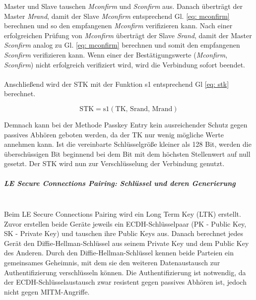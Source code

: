 Master und Slave tauschen \textit{Mconfirm} und \textit{Sconfirm} aus. Danach überträgt der Master \textit{Mrand}, damit der Slave \textit{Mconfirm} entsprechend Gl. \ref{eq: mconfirm} berechnen und so den empfangenen \textit{Mconfirm} verifizieren kann. Nach einer erfolgreichen Prüfung von \textit{Mconfirm} überträgt der Slave \textit{Srand}, damit der Master \textit{Sconfirm} analog zu Gl. \ref{eq: mconfirm} berechnen und somit den empfangenen \textit{Sconfirm} verifizieren kann. Wenn einer der Bestätigungswerte (\textit{Mconfirm}, \textit{Sconfirm}) nicht erfolgreich verifiziert wird, wird die Verbindung sofort beendet.
\\\\
Anschließend wird der STK mit der Funktion s1 \cite{BtSpec4.2_2290} 
entsprechend Gl \ref{eq: stk} \cite{BtSpec4.2_2305-2306} berechnet.

\begin{equation}
    \text{STK} = \text{s1}(\text{TK, Srand, Mrand})
    \label{eq: stk}
\end{equation}

Demnach kann bei der Methode Passkey Entry kein ausreichender Schutz gegen passives Abhören geboten werden, da der TK nur wenig mögliche Werte annehmen kann. Ist die vereinbarte Schlüsselgröße kleiner als 128 Bit, werden die überschüssigen Bit beginnend bei dem Bit mit dem höchsten Stellenwert auf null gesetzt. Der STK wird nun zur Verschlüsselung der Verbindung genutzt. \cite{BtSpec4.2_2305-2306}

\subparagraph{LE Secure Connections Pairing: Schlüssel und deren Generierung} \mbox{} \vspace{0.2cm} \\
Beim LE Secure Connections Pairing wird ein Long Term Key (LTK) erstellt. Zuvor erstellen beide Geräte jeweils ein ECDH-Schlüsselpaar (PK - Public Key, SK - Private Key) und tauschen ihre Public Keys aus. Danach berechnet jedes Gerät den Diffie-Hellman-Schlüssel aus seinem Private Key und dem Public Key des Anderen. Durch den Diffie-Hellman-Schlüssel kennen beide Parteien ein gemeinsames Geheimnis, mit dem sie den weiteren Datenaustausch zur Authentifizierung verschlüsseln können. Die Authentifizierung ist notwendig, da der ECDH-Schlüsselaustausch zwar resistent gegen passives Abhören ist, jedoch nicht gegen MITM-Angriffe. \cite{BtSpec4.2_2307}

